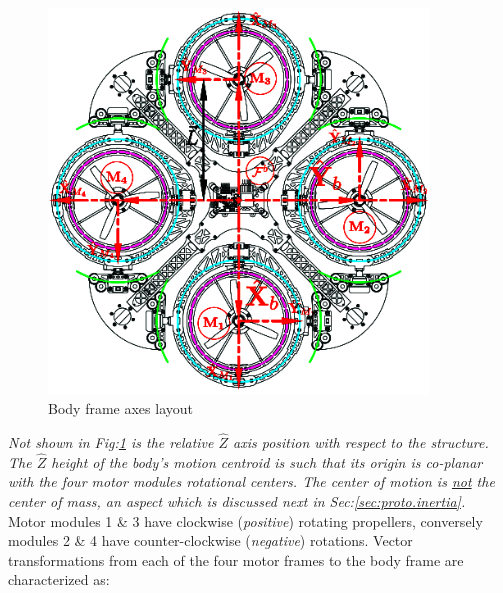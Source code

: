 \begin{figure}[htbp]
\centering
\includegraphics[width=0.9\textwidth]{figs/body-frame}
\caption{Body frame axes layout}
\label{fig:body-frame}
\end{figure}
\par
\emph{\color{Gray}Not shown in Fig:\ref{fig:body-frame} is the relative $\hat{Z}$ axis position with respect to the structure. The $\hat{Z}$ height of the body's motion centroid is such that its origin is co-planar with the four motor modules rotational centers. The center of motion is \underline{not} the center of mass, an aspect which is discussed next in Sec:\ref{sec:proto.inertia}.}
\\
Motor modules 1 \& 3 have clockwise (\emph{positive}) rotating propellers, conversely modules 2 \& 4 have counter-clockwise (\emph{negative}) rotations. Vector transformations from each of the four motor frames to the body frame are characterized as:
